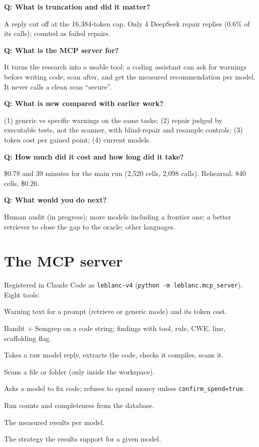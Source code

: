 \documentclass[11pt]{article}
\newcommand{\q}[1]{\par\medskip\noindent\textbf{Q: #1}\par}
\begin{document}
\q{What is truncation and did it matter?}
A reply cut off at the 16{,}384-token cap. Only 4 DeepSeek repair replies (0.6\% of its calls); counted as failed
repairs.

\q{What is the MCP server for?}
It turns the research into a usable tool: a coding assistant can ask for warnings before writing code, scan after,
and get the measured recommendation per model. It never calls a clean scan ``secure''.

\q{What is new compared with earlier work?}
(1) generic vs specific warnings on the same tasks; (2) repair judged by executable tests, not the scanner, with
blind-repair and resample controls; (3) token cost per gained point; (4) current models.

\q{How much did it cost and how long did it take?}
\$0.78 and 39 minutes for the main run (2{,}520 cells, 2{,}098 calls). Rehearsal: 840 cells, \$0.26.

\q{What would you do next?}
Human audit (in progress); more models including a frontier one; a better retriever to close the gap to the oracle;
other languages.

\section{The MCP server}\label{sec:mcp}
Registered in Claude Code as \texttt{leblanc-v4} (\texttt{python -m leblanc.mcp\_server}). Eight tools:
\begin{description}[style=nextline, leftmargin=1.2em]
\item[analyze\_prompt] Warning text for a prompt (retrieve or generic mode) and its token cost.
\item[scan\_code] Bandit + Semgrep on a code string; findings with tool, rule, CWE, line, scaffolding flag.
\item[audit\_response] Takes a raw model reply, extracts the code, checks it compiles, scans it.
\item[scan\_path] Scans a file or folder (only inside the workspace).
\item[repair\_code] Asks a model to fix code; refuses to spend money unless \texttt{confirm\_spend=true}.
\item[project\_status] Run counts and completeness from the database.
\item[results\_summary] The measured results per model.
\item[recommend] The strategy the results support for a given model.
\end{description}
\end{document}

